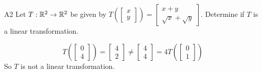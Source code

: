 \documentclass{sbgLAsemi}
\begin{document}
\begin{problem}{A2} 
Let $T: \mathbb{R}^2 \rightarrow \mathbb{R}^2$ be given by $T\left(\begin{bmatrix}x \\ y  \end{bmatrix} \right) = \begin{bmatrix} x+y \\ \sqrt{x}+\sqrt{y} \end{bmatrix}$.  Determine if $T$ is a linear transformation.
\end{problem}
\begin{solution}
$$T\left(\begin{bmatrix} 0 \\ 4 \end{bmatrix}\right) = \begin{bmatrix} 4 \\ 2 \end{bmatrix} \neq \begin{bmatrix} 4 \\ 4 \end{bmatrix} = 4T\left(\begin{bmatrix} 0 \\ 1 \end{bmatrix} \right)$$
So $T$ is not a linear transformation.
\end{solution}
\end{document}
